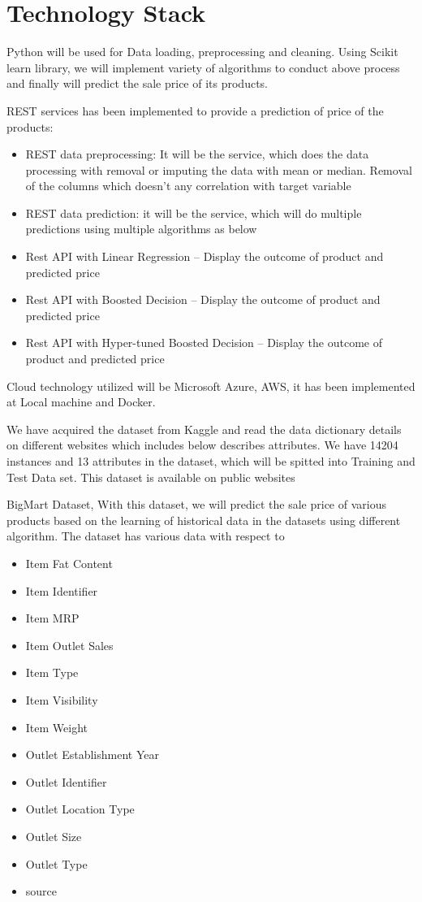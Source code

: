 \section{Technology Stack}

Python will be used for Data loading, preprocessing and cleaning. Using 
Scikit learn library, we will implement variety of algorithms to conduct 
above process and finally will predict the sale price of its products.

REST services has been implemented to provide a prediction of price of the 
products:

\begin{itemize}
	\item REST data preprocessing: It will be the service, which does 
the data processing 
	with removal or imputing the data with mean or median. Removal of 
the columns which doesn’t any correlation with target variable
	\item REST data prediction: it will be the service, which will 
do multiple predictions using multiple algorithms as below
	
	\item Rest API with Linear Regression – Display the outcome 
of product and predicted price
	\item Rest API with Boosted Decision – Display the outcome of 
product and predicted price
	\item Rest API with Hyper-tuned Boosted Decision – Display the 
outcome of product and predicted price
\end{itemize}

Cloud technology utilized will be Microsoft Azure, AWS, it has been 
implemented at Local machine and Docker.

We have acquired the dataset from Kaggle and read the data dictionary details 
on different websites which includes below describes attributes. We have 14204 
instances and 13 attributes in the dataset, which will be spitted into 
Training and Test Data set. This dataset is available on public websites

BigMart Dataset, With this dataset, we will predict the sale price of 
various products based on the learning of historical data in the datasets 
using different algorithm. The dataset has various data with respect to
\begin{itemize}
\item Item Fat Content
\item Item Identifier
\item Item MRP
\item Item Outlet Sales
\item Item Type
\item Item Visibility
\item Item Weight
\item Outlet Establishment Year
\item Outlet Identifier
\item Outlet Location Type
\item Outlet Size
\item Outlet Type
\item source
\end{itemize}
~\cite{kaggleds}


